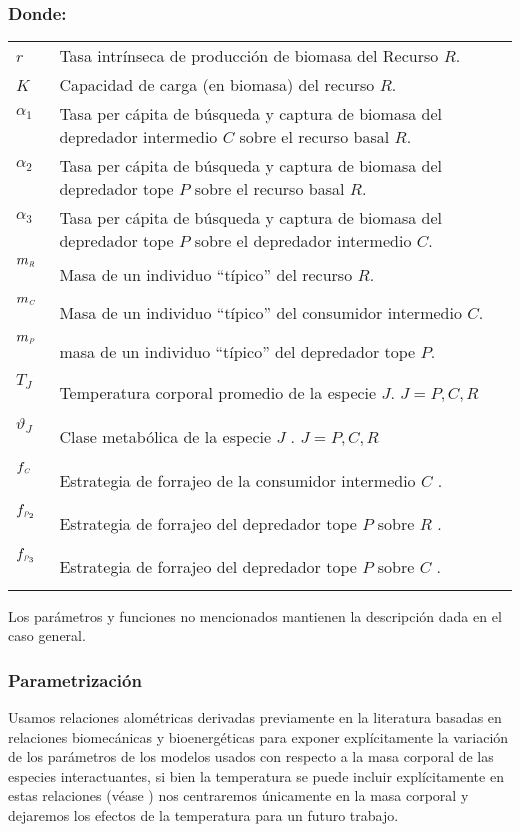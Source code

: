 \subsubsection*{Donde:}
\begin{longtable}{l@{:}p{5.8in}}
$r$  \ & Tasa intr\'inseca de producci\'on de biomasa del Recurso $R$.\\
$K$  \  &Capacidad de carga (en biomasa) del recurso $R$.\\
$\alpha_1$  \ & Tasa per c\'apita de b\'usqueda y captura de biomasa del depredador intermedio $C$ sobre  el recurso basal $R$.\\
$\alpha_2$ \ & Tasa per c\'apita de b\'usqueda y captura de biomasa del depredador tope $P$ sobre  el recurso basal $R$.\\
$\alpha_3$ \  &Tasa per c\'apita de b\'usqueda y captura de biomasa del depredador tope $P$ sobre  el depredador intermedio $C$.\\
$m_{\textit{\tiny R}}$  \ & Masa de un individuo ``t\'ipico'' del recurso $R$.\\
$m_{\textit{\tiny C}}$  \ & Masa de un individuo ``t\'ipico'' del consumidor intermedio $C$.\\
$m_\textit{\tiny P}$  \ & masa de un individuo ``t\'ipico'' del depredador tope $P$.\\
$T_J$ \ & Temperatura corporal promedio de la especie $J$. $J = P,C,R$ \\
$\vartheta_J$ \ & Clase metab\'olica de la especie $J$ . $J = P,C,R$ \\
$f_{\textit{\tiny C}}$ \ & Estrategia de forrajeo de la consumidor intermedio $C$ .\\
$f_{\textit{\tiny P}_2}$ \ & Estrategia de forrajeo del depredador tope $P$ sobre $R$ .\\
$f_{\textit{\tiny P}_3}$ \ & Estrategia de forrajeo del depredador tope $P$ sobre $C$ .\\

\end{longtable}

Los par\'ametros y funciones no mencionados mantienen la descripci\'on dada en el caso general.
\subsubsection{Parametrizaci\'on}
Usamos relaciones alom\'etricas derivadas previamente en la literatura basadas en relaciones biomec\'anicas y bioenerg\'eticas \citep{savage2004predominance,brown2004toward,west1997general,savage2004effects,pawar2012dimensionality,mcgill2006allometric,peters1986ecological,kiltie2000scaling,yodzis1992body} para exponer expl\'icitamente la variaci\'on de los par\'ametros de los modelos usados con respecto a la masa corporal de las especies interactuantes,  si bien la temperatura se puede incluir expl\'icitamente en estas relaciones (v\'ease \citealt{brown2004toward,savage2004effects}) nos centraremos \'unicamente en la masa corporal y dejaremos los efectos de la temperatura para un futuro trabajo. 


